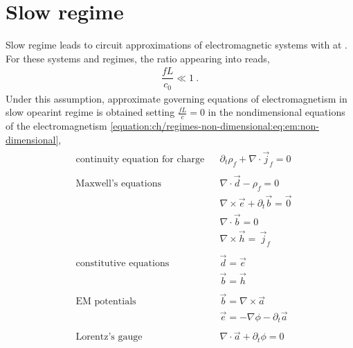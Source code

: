 \documentclass[letterpaper,10pt,english]{jupyterBook}
\begin{document}
\section{Slow regime}
\label{\detokenize{ch/regimes-slow:slow-regime}}\label{\detokenize{ch/regimes-slow:classical-electromagnetism-regimes-slow}}\label{\detokenize{ch/regimes-slow::doc}}
\sphinxAtStartPar
Slow regime leads to circuit approximations of electromagnetic systems with  at . For these systems and regimes, the ratio appearing into {\hyperref[\detokenize{ch/regimes-non-dimensional:classical-electromagnetism-regimes-non-dimensional}]{}} reads,
\begin{equation*}
\begin{split}\dfrac{f L }{c_0} \ll 1 \ .\end{split}
\end{equation*}
\sphinxAtStartPar
Under this assumption, approximate governing equations of electromagnetism in slow opearint regime is obtained setting \(\frac{fL}{c} = 0\) in the non\sphinxhyphen{}dimensional equations of the electromagnetism \eqref{equation:ch/regimes-non-dimensional:eq:em:non-dimensional},
\begin{equation}\label{equation:ch/regimes-slow:eq:em:non-dimensional:slow}
\begin{split}
\begin{aligned}
  & \text{continuity equation for charge}        &&  \partial_t \rho_f +  \nabla \cdot \vec{j}_f = 0 \\ \\
  & \text{Maxwell's equations}                   &&  \nabla \cdot \vec{d} - \rho_f = 0 \\
  &                                              &&  \nabla \times \vec{e} +  \partial_t \vec{b} = \vec{0} \\ 
  &                                              &&  \nabla \cdot \vec{b} = 0 \\
  &                                              &&  \nabla \times \vec{h} = \, \vec{j}_f  \\ \\
  & \text{constitutive equations}                &&  \vec{d} = \vec{e} \\
  &                                              &&  \vec{b} = \vec{h} \\ \\
  & \text{EM potentials}                         &&  \vec{b} = \nabla \times \vec{a} \\
  &                                              &&  \vec{e} = - \nabla \phi - \partial_t \vec{a} \\ \\
  & \text{Lorentz's gauge}                       &&  \nabla \cdot \vec{a} + \partial_t \phi = 0
\end{aligned}
\end{split}
\end{equation}
\end{document}
